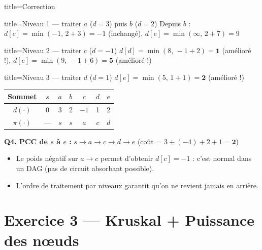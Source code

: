 \documentclass[12pt,a4paper]{article}
\begin{document}
\begin{correction}{title=Correction}
\begin{etape}{title=Niveau 1 --- traiter $a$ ($d=3$) puis $b$ ($d=2$)}
Depuis $b$ : $d[c] = \min(-1,\, 2+3) = -1$ (inchang\'e), \quad $d[e] = \min(\infty,\, 2+7) = 9$
\end{etape}

\begin{etape}{title=Niveau 2 --- traiter $c$ ($d=-1$)}
$d[d] = \min(8,\, -1+2) = \mathbf{1}$ \quad (am\'elior\'e !), \quad $d[e] = \min(9,\, -1+6) = \mathbf{5}$ \quad (am\'elior\'e !)
\end{etape}

\begin{etape}{title=Niveau 3 --- traiter $d$ ($d=1$)}
$d[e] = \min(5,\, 1+1) = \mathbf{2}$ \quad (am\'elior\'e !)
\end{etape}

\begin{center}
\renewcommand{\arraystretch}{1.3}
\begin{tabular}{|c|c|c|c|c|c|c|}
\hline
\textbf{Sommet} & $s$ & $a$ & $b$ & $c$ & $d$ & $e$ \\\hline
$d(\cdot)$ & 0 & 3 & 2 & $-1$ & 1 & 2 \\\hline
$\pi(\cdot)$ & --- & $s$ & $s$ & $a$ & $c$ & $d$ \\\hline
\end{tabular}
\end{center}

\textbf{Q4. PCC de $s$ \`a $e$ :} $s \to a \to c \to d \to e$ \quad (co\^ut = $3 + (-4) + 2 + 1 = \mathbf{2}$)
\end{correction}

\begin{attention}
\begin{itemize}
    \item Le poids n\'egatif sur $a \to c$ permet d'obtenir $d[c] = -1$ : c'est normal dans un DAG (pas de circuit absorbant possible).
    \item L'ordre de traitement par niveaux garantit qu'on ne revient jamais en arri\`ere.
\end{itemize}
\end{attention}


\newpage
\section{Exercice 3 --- Kruskal + Puissance des n\oe uds}
\end{document}
